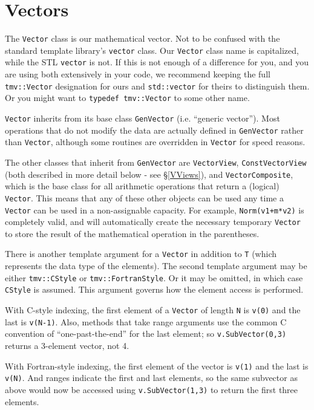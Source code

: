 \documentclass[twoside,letterpaper,11pt]{article}
\renewcommand{\tt}[1]{{\texttt {#1}}}
\begin{document}
\newpage
\section{Vectors}

The \tt{Vector} class is our mathematical vector.  Not to be confused with
the standard template library's \tt{vector} class.  
Our \tt{Vector} class name is capitalized, while the STL \tt{vector} is not.
If this is not enough of a difference for you, and you are using both extensively in your code,
we recommend keeping the full \tt{tmv::Vector} designation for ours and \tt{std::vector}
for theirs to distinguish them.  Or you might want to \tt{typedef tmv::Vector} to some other name.

\tt{Vector} inherits from its base class \tt{GenVector} (i.e. ``generic vector'').
Most operations that do not 
modify the data are actually defined in \tt{GenVector} rather than \tt{Vector}, although
some routines are overridden in \tt{Vector} for speed reasons.  

The other classes that inherit from \tt{GenVector} are \tt{VectorView}, 
\tt{ConstVectorView} (both described in more detail below - see \S\ref{VViews}), and
\tt{VectorComposite}, which is the base class for all arithmetic operations that
return a (logical) \tt{Vector}.  This means that any of these other objects can be used
any time a \tt{Vector} can be used in a non-assignable capacity.  For example,
\tt{Norm(v1+m*v2)} is completely valid, and will automatically create the necessary
temporary \tt{Vector} to store the result of the mathematical operation in the parentheses.

There is another template argument for a \tt{Vector} in addition to \tt{T} (which
represents the data type of the elements).  The second template argument
may be either \tt{tmv::CStyle} or \tt{tmv::FortranStyle}.  Or it may be omitted,
in which case \tt{CStyle} is assumed.  This argument governs how the element
access is performed.

With C-style indexing, the first element of a \tt{Vector} of length \tt{N} is 
\tt{v(0)} and the last is \tt{v(N-1)}.  Also, methods that take range arguments
use the common C convention of ``one-past-the-end'' for the last element;
so \tt{v.SubVector(0,3)} returns a 3-element vector, not 4.

With Fortran-style indexing, the first element of the vector is \tt{v(1)} and the 
last is \tt{v(N)}.  And ranges indicate the first and last elements, so the same
subvector as above would now be accessed using \tt{v.SubVector(1,3)} to return
the first three elements.
\end{document}
